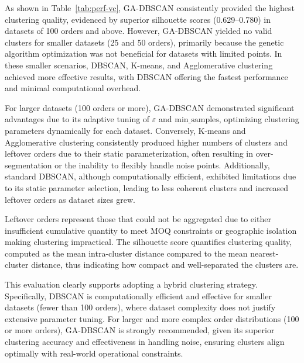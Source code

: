 As shown in Table~\ref{tab:perf-vc}, GA-DBSCAN consistently provided the highest clustering quality, evidenced by superior silhouette scores (0.629–0.780) in datasets of 100 orders and above. However, GA-DBSCAN yielded no valid clusters for smaller datasets (25 and 50 orders), primarily because the genetic algorithm optimization was not beneficial for datasets with limited points. In these smaller scenarios, DBSCAN, K-means, and Agglomerative clustering achieved more effective results, with DBSCAN offering the fastest performance and minimal computational overhead.

For larger datasets (100 orders or more), GA-DBSCAN demonstrated significant advantages due to its adaptive tuning of \(\varepsilon\) and \(\text{min\_samples}\), optimizing clustering parameters dynamically for each dataset. Conversely, K-means and Agglomerative clustering consistently produced higher numbers of clusters and leftover orders due to their static parameterization, often resulting in over-segmentation or the inability to flexibly handle noise points. Additionally, standard DBSCAN, although computationally efficient, exhibited limitations due to its static parameter selection, leading to less coherent clusters and increased leftover orders as dataset sizes grew.

Leftover orders represent those that could not be aggregated due to either insufficient cumulative quantity to meet MOQ constraints or geographic isolation making clustering impractical. The silhouette score quantifies clustering quality, computed as the mean intra-cluster distance compared to the mean nearest-cluster distance, thus indicating how compact and well-separated the clusters are.

This evaluation clearly supports adopting a hybrid clustering strategy. Specifically, DBSCAN is computationally efficient and effective for smaller datasets (fewer than 100 orders), where dataset complexity does not justify extensive parameter tuning. For larger and more complex order distributions (100 or more orders), GA-DBSCAN is strongly recommended, given its superior clustering accuracy and effectiveness in handling noise, ensuring clusters align optimally with real-world operational constraints.

